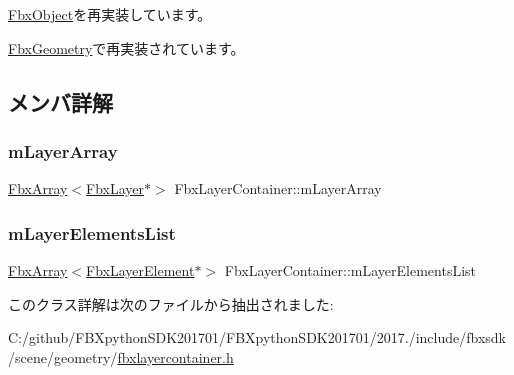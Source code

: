 \hyperlink{class_fbx_object_a5f01a45e03bbf2c243ae9ef71d9050cf}{Fbx\+Object}を再実装しています。



\hyperlink{class_fbx_geometry_a4e28b47a5f6dba7d53e692486d69c126}{Fbx\+Geometry}で再実装されています。



\subsection{メンバ詳解}
\mbox{\label{class_fbx_layer_container_afb0f4b99b62fcfa0203831995dc4e274}} 
\subsubsection{\texorpdfstring{m\+Layer\+Array}{mLayerArray}}
{\footnotesize\ttfamily \hyperlink{class_fbx_array}{Fbx\+Array}$<$\hyperlink{class_fbx_layer}{Fbx\+Layer}$\ast$$>$ Fbx\+Layer\+Container\+::m\+Layer\+Array\hspace{0.3cm}{\ttfamily [protected]}}

\mbox{\label{class_fbx_layer_container_a7f935eeb2435e0b3cfa69bd1b54b5c11}} 
\subsubsection{\texorpdfstring{m\+Layer\+Elements\+List}{mLayerElementsList}}
{\footnotesize\ttfamily \hyperlink{class_fbx_array}{Fbx\+Array}$<$\hyperlink{class_fbx_layer_element}{Fbx\+Layer\+Element}$\ast$$>$ Fbx\+Layer\+Container\+::m\+Layer\+Elements\+List\hspace{0.3cm}{\ttfamily [protected]}}



このクラス詳解は次のファイルから抽出されました\+:\begin{DoxyCompactItemize}
\item 
C\+:/github/\+F\+B\+Xpython\+S\+D\+K201701/\+F\+B\+Xpython\+S\+D\+K201701/2017./include/fbxsdk/scene/geometry/\hyperlink{fbxlayercontainer_8h}{fbxlayercontainer.\+h}\end{DoxyCompactItemize}
